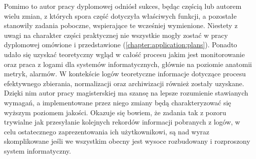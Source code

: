 Pomimo to autor pracy dyplomowej odniósł sukces, będąc częścią lub autorem wielu zmian, z których spora część dotyczyła
właściwych funkcji, a pozostałe stanowiły zadania poboczne, wspierające te wcześniej wymienione. Niestety z uwagi
na charakter części praktycznej nie wszystkie mogły zostać w pracy dyplomowej omówione i przedstawione 
(\ref{chapter:application:plans}). 
Ponadto udało się uzyskać teoretyczny wgląd w całość procesu jakim
jest monitorowanie oraz praca z logami dla systemów informatycznych, głównie na poziomie anatomii metryk, alarmów.
W kontekście logów teoretyczne informacje dotyczące procesu efektywnego zbierania, normalizacji oraz archiwizacji 
również zostały uzyskane. Dzięki nim autor pracy magisterskiej ma szansę na lepsze rozumienie stawianych
wymagań, a implementowane przez niego zmiany będą charakteryzować się wyższym poziomem jakości. Okazuje się bowiem, że
zadania tak z pozoru trywialne jak przesyłanie kolejnych rekordów informacji pobranych z logów, w celu ostatecznego
zaprezentowania ich użytkownikowi, są nad wyraz skomplikowane jeśli we wszystkim obecny jest wysoce rozbudowany
i rozproszony system informatyczny.